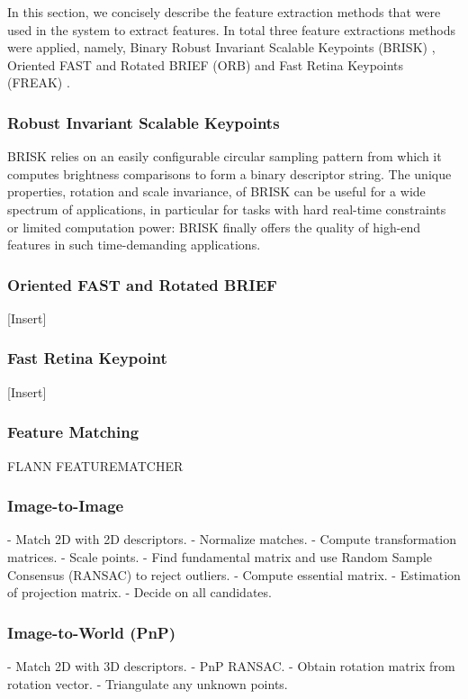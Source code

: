 \documentclass[a4paper]{article}
\begin{document}
In this section, we concisely describe the feature extraction methods that were
used in the system to extract features. In total three feature extractions
methods were applied, namely, Binary Robust Invariant Scalable Keypoints
(BRISK) \citep{Leutenegger2011}, Oriented FAST and Rotated BRIEF (ORB)
\citep{Rublee2011} and Fast Retina Keypoints (FREAK) \citep{Ortiz2012}.

\subsubsection*{Robust Invariant Scalable Keypoints}
BRISK relies on an easily configurable circular sampling pattern from which it
computes brightness comparisons to form a binary descriptor string. The unique
properties, rotation and scale invariance, of BRISK can be useful for a wide
spectrum of applications, in particular for tasks with hard real-time
constraints or limited computation power: BRISK finally offers the quality of
high-end features in such time-demanding applications.

\subsubsection*{Oriented FAST and Rotated BRIEF}
[Insert]
\subsubsection*{Fast Retina Keypoint}
[Insert]

\subsubsection{Feature Matching}
FLANN FEATUREMATCHER \citep{Muja2009}

\subsubsection{Image-to-Image}
- Match 2D with 2D descriptors.
- Normalize matches.
- Compute transformation matrices.
- Scale points.
- Find fundamental matrix and use Random Sample Consensus (RANSAC) to reject
outliers. \citep{fischler1981random}
- Compute essential matrix.
- Estimation of projection matrix.
- Decide on all candidates.

\subsubsection{Image-to-World (PnP)}
- Match 2D with 3D descriptors.
- PnP RANSAC.
- Obtain rotation matrix from rotation vector.
- Triangulate any unknown points.
\end{document}
